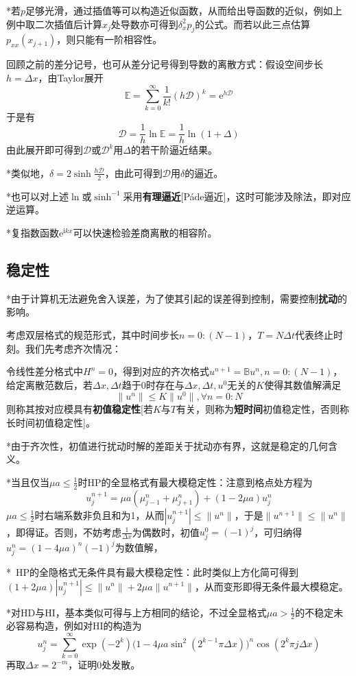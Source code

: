 \documentclass[a4paper,UTF8,fontset=windows]{ctexart}
\begin{document}
*若$p$足够光滑，通过插值等可以构造近似函数，从而给出导函数的近似，例如上例中取二次插值后计算$x_j$处导数亦可得到$\delta_x^2p_j$的公式。而若以此三点估算$p_{xx}(x_{j+1})$，则只能有一阶相容性。

回顾之前的差分记号，也可从差分记号得到导数的离散方式：假设空间步长$h=\Delta x$，由Taylor展开
$$\mathbb{E}=\sum_{k=0}^\infty\frac{1}{k!}(h\mathcal{D})^k=\mathrm{e}^{h\mathcal{D}}$$
于是有
$$\mathcal{D}=\frac{1}{h}\ln\mathbb{E}=\frac{1}{h}\ln(1+\Delta)$$
由此展开即可得到$\mathcal{D}$或$\mathcal{D}^k$用$\Delta$的若干阶逼近结果。

*类似地，$\delta=2\sinh\frac{h\mathcal{D}}{2}$，由此可得到$\mathcal{D}$用$\delta$的逼近。

*也可以对上述$\ln$或$\sinh^{-1}$采用\textbf{有理逼近}[P\'ade逼近]，这时可能涉及除法，即对应逆运算。

*复指数函数$\mathrm{e}^{\mathrm{i}kx}$可以快速检验差商离散的相容阶。

\subsection{稳定性}

*由于计算机无法避免舍入误差，为了使其引起的误差得到控制，需要控制\textbf{扰动}的影响。

考虑双层格式的规范形式，其中时间步长$n=0:(N-1)$，$T=N\Delta t$代表终止时刻。我们先考虑齐次情况：

令线性差分格式中$H^n=0$，得到对应的齐次格式$u^{n+1}=\mathbb{B}u^n,n=0:(N-1)$，给定离散范数后，若$\Delta x,\Delta t$趋于0时存在与$\Delta x,\Delta t,u^0$无关的$K$使得其数值解满足
$$\|u^n\|\le K\|u^0\|,\forall n=0:N$$
则称其按对应模具有\textbf{初值稳定性}[若$K$与$T$有关，则称为\textbf{短时间}初值稳定性，否则称长时间初值稳定性]。

*由于齐次性，初值进行扰动时解的差距关于扰动亦有界，这就是稳定的几何含义。

*当且仅当$\mu a\le\frac{1}{2}$时HP的全显格式有最大模稳定性：注意到格点处方程为
$$u_j^{n+1}=\mu a(\mu_{j-1}^n+\mu_{j+1}^n)+(1-2\mu a)u_j^n$$
$\mu a\le\frac{1}{2}$时右端系数非负且和为1，从而$|u_j^{n+1}|\le\|u^n\|$，于是$\|u^{n+1}\|\le\|u^n\|$，即得证。否则，不妨考虑$\frac{1}{\Delta x}$为偶数时，初值$u_j^0=(-1)^j$，可归纳得$u_j^n=(1-4\mu a)^n(-1)^j$为数值解，

*\ HP的全隐格式无条件具有最大模稳定性：此时类似上方化简可得到$(1+2\mu a)|u_j^{n+1}|\le\|u^n\|+2\mu a\|u^{n+1}\|$，从而变形即得无条件最大模稳定。

*对HD与HI，基本类似可得与上方相同的结论，不过全显格式$\mu a>\frac{1}{2}$的不稳定未必容易构造，例如对HI的构造为
$$u_j^n=\sum_{k=0}^\infty\exp(-2^k)\bigg(1-4\mu a\sin^2(2^{k-1}\pi\Delta x)\bigg)^n\cos(2^k\pi j\Delta x)$$
再取$\Delta x=2^{-m}$，证明0处发散。
\end{document}
